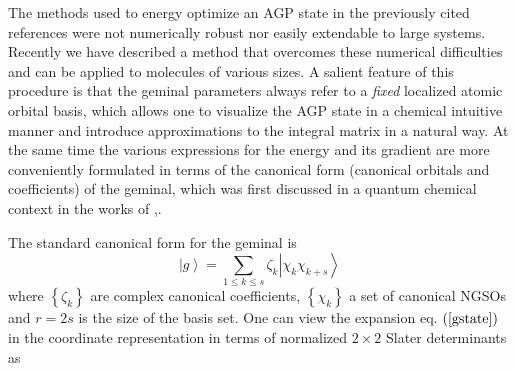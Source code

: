 \documentclass[aps,preprint]{revtex4}%
\begin{document}
The methods used to energy optimize an AGP state in the previously cited
references were not numerically robust nor easily extendable to large systems.
Recently we have \cite{Weiner&Ortiz02} described a method that overcomes these
numerical difficulties and can be applied to molecules of various sizes. A
salient feature of this procedure is that the geminal parameters always refer
to a \emph{fixed} localized atomic orbital basis, which allows one to
visualize the AGP state in a chemical intuitive manner and introduce
approximations to the integral matrix in a natural way. At the same time the
various expressions for the energy and its gradient are more conveniently
formulated in terms of the canonical form (canonical orbitals and
coefficients) of the geminal, which was first discussed in a quantum chemical
context in the works of \cite{Coleman63},\cite{Lowdin56}.

The standard canonical form for the geminal is
\begin{equation}
\left\vert g\right\rangle =\sum_{1\leq k\leq s}\zeta_{k}\left\vert \chi
_{k}\chi_{k+s}\right\rangle \label{gstate}%
\end{equation}
where $\left\{  \zeta_{k}\right\}  $ are complex canonical coefficients,
$\left\{  \chi_{k}\right\}  $ a set of canonical NGSOs and $r=2s$ is the size
of the basis set. One can view the expansion eq. $\left(  \ref{gstate}\right)
$ in the coordinate representation in terms of normalized $2\times2$ Slater
determinants as%
\end{document}
